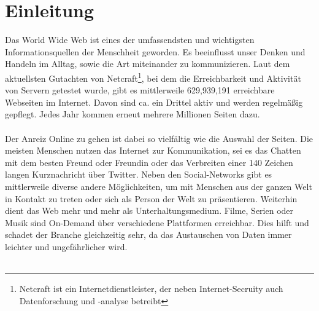 %
%
%
%


\chapter{Einleitung}

Das World Wide Web ist eines der umfassendsten und wichtigsten Informationsquellen der Menschheit geworden. Es beeinflusst unser Denken und Handeln im Alltag, sowie die Art miteinander zu kommunizieren. Laut dem aktuellsten Gutachten\cite{websurvey} von Netcraft\footnote{Netcraft ist ein Internetdienstleister, der neben Internet-Secruity auch Datenforschung und -analyse betreibt}, bei dem die Erreichbarkeit und Aktivität von Servern getestet wurde, gibt es mittlerweile 629,939,191 erreichbare Webseiten im Internet. Davon sind ca. ein Drittel aktiv und werden regelmäßig gepflegt. Jedes Jahr kommen erneut mehrere Millionen Seiten dazu.\\
\\
Der Anreiz \glqq Online zu gehen\grqq{} ist dabei so vielfältig wie die Auswahl der Seiten. Die meisten Menschen nutzen das Internet zur Kommunikation, sei es das Chatten mit dem besten Freund oder Freundin oder das Verbreiten einer 140 Zeichen langen Kurznachricht über Twitter. Neben den Social-Networks gibt es mittlerweile diverse andere Möglichkeiten, um mit Menschen aus der ganzen Welt in Kontakt zu treten oder sich als Person der Welt zu präsentieren. Weiterhin dient das Web mehr und mehr als Unterhaltungsmedium. Filme, Serien oder Musik sind \Gls{On-Demand} über verschiedene Plattformen erreichbar. Dies hilft und schadet der Branche gleichzeitig sehr, da das Austauschen von Daten immer leichter und ungefährlicher wird.\\
\\
